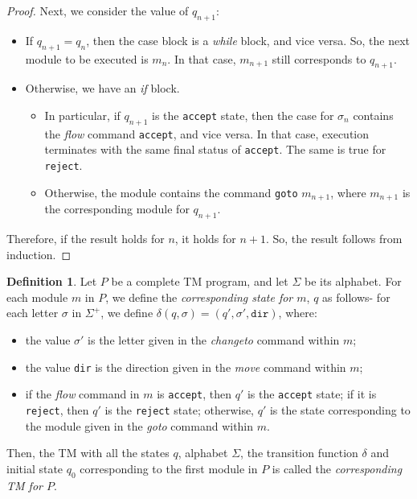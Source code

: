 \documentclass{article}
\theoremstyle{definition}
\newtheorem{definition}[rules]{Definition}
\theoremstyle{plain}
\begin{document}
\begin{proof}
    Next, we consider the value of $q_{n+1}$:
    \begin{itemize}
        \item If $q_{n+1} = q_n$, then the case block is a \textit{while} block, and vice versa. So, the next module to be executed is $m_n$. In that case, $m_{n+1}$ still corresponds to $q_{n+1}$.
        \item Otherwise, we have an \textit{if} block. 
        \begin{itemize}
            \item In particular, if $q_{n+1}$ is the \texttt{accept} state, then the case for $\sigma_n$ contains the \textit{flow} command \texttt{accept}, and vice versa. In that case, execution terminates with the same final status of \texttt{accept}. The same is true for \texttt{reject}. 
            \item Otherwise, the module contains the command \texttt{goto} $m_{n+1}$, where $m_{n+1}$ is the corresponding module for $q_{n+1}$.
        \end{itemize}
    \end{itemize}
    Therefore, if the result holds for $n$, it holds for $n+1$. So, the result follows from induction.
\end{proof}

\begin{definition}
    Let $P$ be a complete TM program, and let $\Sigma$ be its alphabet. For each module $m$ in $P$, we define the \emph{corresponding state for $m$}, $q$ as follows- for each letter $\sigma$ in $\Sigma^+$, we define $\delta(q, \sigma) = (q', \sigma', \texttt{dir})$, where:
    \begin{itemize}
        \item the value $\sigma'$ is the letter given in the \textit{changeto} command within $m$;
        \item the value \texttt{dir} is the direction given in the \textit{move} command within $m$;
        \item if the \textit{flow} command in $m$ is \texttt{accept}, then $q'$ is the \texttt{accept} state; if it is \texttt{reject}, then $q'$ is the \texttt{reject} state; otherwise, $q'$ is the state corresponding to the module given in the \textit{goto} command within $m$.
    \end{itemize}
    Then, the TM with all the states $q$, alphabet $\Sigma$, the transition function $\delta$ and initial state $q_0$ corresponding to the first module in $P$ is called the \emph{corresponding TM for $P$}.
\end{definition}
\end{document}
